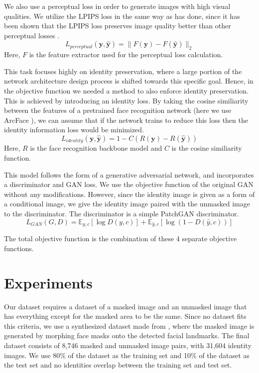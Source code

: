 \documentclass[sigconf,authorversion,nonacm]{acmart}
\begin{document}
We also use a perceptual loss in order to generate images with high visual qualities. We
utilize the LPIPS loss \cite{LPIPS} in the same way as \cite{PSP} has done,
since it has been shown that the LPIPS
loss preserves image quality better than other perceptual losses \cite{LPIPS2}.
\[
    L_{perceptual}(\mathbf{y}, \mathbf{\hat{y}}) = \|F(\mathbf{y}) - F(\mathbf{\hat{y}})\|_2
\]
Here, $F$ is the feature extractor used for the perceptual loss calculation.

This task focuses highly on identity preservation, where a large portion of the network
architecture design process is shifted towards this specific goal. Hence, in the objective
function we needed a method to also enforce identity preservation. This is achieved by
introducing an identity loss. By taking the cosine similiarity between the features of
a pretrained face recognition network (here we use ArcFace \cite{Arcface}), we can assume
that if the network trains to reduce this loss then the identity information loss would be
minimized.
\[
    L_{identity}(\mathbf{y}, \mathbf{\hat{y}}) = 1- C(R(\mathbf{y}) - R(\mathbf{\hat{y}}))
\]
Here, $R$ is the face recognition backbone model and $C$ is the cosine similiarity
function.

This model follows the form of a generative adversarial network, and incorporates a discriminator
and GAN loss. We use the objective function of the original GAN without any modifications.
However, since the identity image is given as a form of a conditional image, we give the
identity image paired with the unmasked image to the discriminator.
The discriminator is a simple PatchGAN \cite{PatchGAN} discriminator.
\[
    L_{GAN} (G, D) = \mathbb{E}_{y, c}\left[\log D(y, c)\right] + \mathbb{E}_{\hat{y}, c}\left[\log ( 1- D(\hat{y}, c))\right]
\]

The total objective function is the combination of these 4 separate objective functions.

\section{Experiments}
Our dataset requires a dataset of a masked image and an unmasked image that has everything except for the masked area to be the same. Since no dataset fits this criteria,
we use a synthesized dataset made from \cite{AI-Hub}, where the masked image is generated by
morphing face masks onto the detected facial landmarks. The final dataset consists of 8,746 masked and unmasked image pairs, with 31,604 identity images.
We use 80\% of the dataset as the training set and 10\% of the dataset as the test set and no
identities overlap between the training set and test set.
\end{document}
